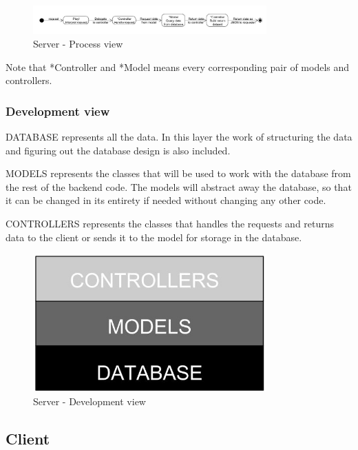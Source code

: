 \documentclass[11pt]{book}
\begin{document}
\begin{figure}[H]
      \centering
      \includegraphics[width=0.8\textwidth]{Figures/Architecture/serverProcess.jpg}
      \caption{Server - Process view}
      \label{fig:arch_server_process}
\end{figure}

Note that *Controller and *Model means every corresponding pair of models and controllers.

\subsubsection{Development view}
DATABASE represents all the data. In this layer the work of structuring the data and figuring out the database design is also included.

MODELS represents the classes that will be used to work with the database from the rest of the backend code. The models will abstract away the database, so that it can be changed in its entirety if needed without changing any other code.

CONTROLLERS represents the classes that handles the requests and returns data to the client or sends it to the model for storage in the database.

\begin{figure}[H]
      \centering
      \includegraphics[width=0.8\textwidth]{Figures/Architecture/serverDevelopment.jpg}
      \caption{Server - Development view}
      \label{fig:arch_server_development}
\end{figure}

\subsection{Client}
\end{document}
